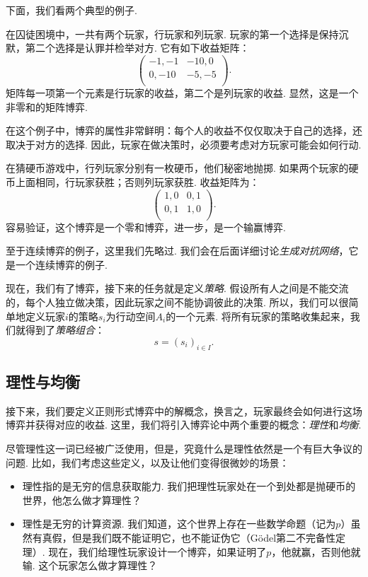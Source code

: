 下面，我们看两个典型的例子. 

\begin{example}[囚徒困境]\label{ex:prisoner}
在囚徒困境中，一共有两个玩家，行玩家和列玩家. 玩家的第一个选择是保持沉默，第二个选择是认罪并检举对方. 它有如下收益矩阵：
\[
\begin{pmatrix}
-1,-1&-10,0\\
0,-10&-5,-5\\
\end{pmatrix}.
\]
矩阵每一项第一个元素是行玩家的收益，第二个是列玩家的收益. 显然，这是一个非零和的矩阵博弈. 

在这个例子中，博弈的属性非常鲜明：每个人的收益不仅仅取决于自己的选择，还取决于对方的选择. 因此，玩家在做决策时，必须要考虑对方玩家可能会如何行动. 
\end{example}

\begin{example}[猜硬币游戏]\label{ex:matching-pennies}
在猜硬币游戏中，行列玩家分别有一枚硬币，他们秘密地抛掷. 如果两个玩家的硬币上面相同，行玩家获胜；否则列玩家获胜. 收益矩阵为：
    \[
    \begin{pmatrix}
    1,0&0,1\\
    0,1&1,0\\
    \end{pmatrix}.
    \]
容易验证，这个博弈是一个零和博弈，进一步，是一个输赢博弈.
\end{example}

至于连续博弈的例子，这里我们先略过. 我们会在后面详细讨论\textit{生成对抗网络}，它是一个连续博弈的例子.

现在，我们有了博弈，接下来的任务就是定义\textit{策略}. 假设所有人之间是不能交流的，每个人独立做决策，因此玩家之间不能协调彼此的决策. 所以，我们可以很简单地定义玩家$i$的策略$s_i$为行动空间$A_i$的一个元素. 将所有玩家的策略收集起来，我们就得到了\textit{策略组合}：
\[
s=(s_i)_{i\in I}.
\]

\subsection{理性与均衡}

接下来，我们要定义正则形式博弈中的解概念，换言之，玩家最终会如何进行这场博弈并获得对应的收益. 这里，我们将引入博弈论中两个重要的概念：\textit{理性}和\textit{均衡}. 

尽管理性这一词已经被广泛使用，但是，究竟什么是理性依然是一个有巨大争议的问题. 比如，我们考虑这些定义，以及让他们变得很微妙的场景：
\begin{itemize}
    \item 理性指的是无穷的信息获取能力. 我们把理性玩家处在一个到处都是抛硬币的世界，他怎么做才算理性？
    \item 理性是无穷的计算资源. 我们知道，这个世界上存在一些数学命题（记为$p$）虽然有真假，但是我们既不能证明它，也不能证伪它（Gödel第二不完备性定理）. 现在，我们给理性玩家设计一个博弈，如果证明了$p$，他就赢，否则他就输. 这个玩家怎么做才算理性？
\end{itemize}

